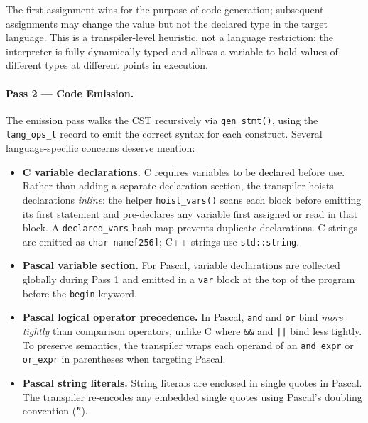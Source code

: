 The first assignment wins for the purpose of code generation; subsequent
assignments may change the value but not the declared type in the target
language.  This is a transpiler-level heuristic, not a language restriction:
the interpreter is fully dynamically typed and allows a variable to hold
values of different types at different points in execution.

\paragraph{Pass 2 --- Code Emission.}
The emission pass walks the CST recursively via \texttt{gen\_stmt()}, using
the \texttt{lang\_ops\_t} record to emit the correct syntax for each construct.
Several language-specific concerns deserve mention:

\begin{itemize}
  \item \textbf{C variable declarations.}  C requires variables to be declared
        before use.  Rather than adding a separate declaration section, the
        transpiler hoists declarations \emph{inline}: the helper
        \texttt{hoist\_vars()} scans each block before emitting its first
        statement and pre-declares any variable first assigned or read in that
        block.  A \texttt{declared\_vars} hash map prevents duplicate
        declarations.  C strings are emitted as \texttt{char name[256]};
        C++ strings use \texttt{std::string}.

  \item \textbf{Pascal variable section.}  For Pascal, variable declarations
        are collected globally during Pass 1 and emitted in a \texttt{var}
        block at the top of the program before the \texttt{begin} keyword.

  \item \textbf{Pascal logical operator precedence.}  In Pascal, \texttt{and}
        and \texttt{or} bind \emph{more tightly} than comparison operators,
        unlike C where \texttt{\&\&} and \texttt{||} bind less tightly.
        To preserve semantics, the transpiler wraps each operand of an
        \texttt{and\_expr} or \texttt{or\_expr} in parentheses when targeting
        Pascal.

  \item \textbf{Pascal string literals.}  String literals are enclosed in
        single quotes in Pascal.  The transpiler re-encodes any embedded
        single quotes using Pascal's doubling convention (\texttt{''}).
\end{itemize}

